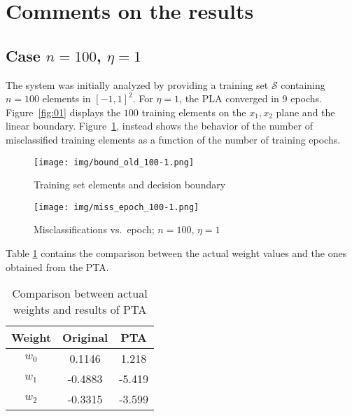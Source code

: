 \documentclass[12pt]{article}
\begin{document}
\section{Comments on the results}

\subsection{Case $n=100$, $\eta=1$}
\label{sec:100-1}

The system was initially analyzed by providing a training set $\mathcal{S}$ containing $n = 100$ elements in ${[-1, 1]}^{2}$.
For $\eta = 1$, the PLA converged in 9 epochs.
Figure~\ref{fig:01} displays the $100$ training elements on the $x_1, x_2$ plane and the linear boundary.
Figure~\ref{fig:02}, instead shows the behavior of the number of misclassified training elements as a function of the number of training epochs.

\begin{figure} [ht]
    \begin{minipage}{0.45\linewidth}
    \centering
        \texttt{[image: img/bound\_old\_100-1.png]}
        \caption{Training set elements and decision boundary}
        \label{fig:01}
    \end{minipage}
    \hspace{0.5cm}
    \begin{minipage}{0.45\linewidth}
    \centering
        \texttt{[image: img/miss\_epoch\_100-1.png]}
        \caption{Misclassifications vs.\ epoch; $n=100$, $\eta=1$}
        \label{fig:02}
    \end{minipage}
\end{figure}

Table \ref{tab:01} contains the comparison between the actual weight values and the ones obtained from the PTA.

\begin{table}[h]
    \centering
    \begin{tabular}{|c|c|c|}
        \hline
        Weight & \textbf{Original} & \textbf{PTA} \\ 
        \hline
        \hline
        $w_0$ & 0.1146 & 1.218 \\
        \hline
        $w_1$ & -0.4883 & -5.419 \\
        \hline
        $w_2$ & -0.3315 & -3.599 \\
        \hline
    \end{tabular}
    \caption{Comparison between actual weights and results of PTA}
    \label{tab:01}
\end{table}
\end{document}
